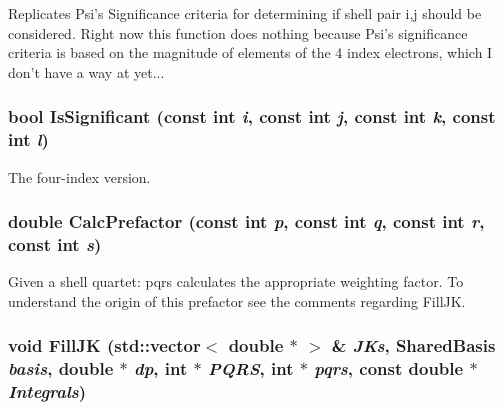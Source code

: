 Replicates Psi's Significance criteria for determining if shell pair i,j should be considered. Right now this function does nothing because Psi's significance criteria is based on the magnitude of elements of the 4 index electrons, which I don't have a way at yet... \hypertarget{classJKBuilder_1_1PsiShared_a0ec04bf57470f228eeb9e8f608014edf}{
\subsubsection[{IsSignificant}]{\setlength{\rightskip}{0pt plus 5cm}bool IsSignificant (const int {\em i}, \/  const int {\em j}, \/  const int {\em k}, \/  const int {\em l})}}
\label{classJKBuilder_1_1PsiShared_a0ec04bf57470f228eeb9e8f608014edf}


The four-\/index version. \hypertarget{classJKBuilder_1_1PsiShared_af71d3f76014ba72b33336cef6ad2e397}{
\subsubsection[{CalcPrefactor}]{\setlength{\rightskip}{0pt plus 5cm}double CalcPrefactor (const int {\em p}, \/  const int {\em q}, \/  const int {\em r}, \/  const int {\em s})}}
\label{classJKBuilder_1_1PsiShared_af71d3f76014ba72b33336cef6ad2e397}


Given a shell quartet: pqrs calculates the appropriate weighting factor. To understand the origin of this prefactor see the comments regarding FillJK. \hypertarget{classJKBuilder_1_1PsiShared_a4b5b1a33d6eb89835454c8b852a1e63b}{
\subsubsection[{FillJK}]{\setlength{\rightskip}{0pt plus 5cm}void FillJK (std::vector$<$ double $\ast$ $>$ \& {\em JKs}, \/  {\bf SharedBasis} {\em basis}, \/  double $\ast$ {\em dp}, \/  int $\ast$ {\em PQRS}, \/  int $\ast$ {\em pqrs}, \/  const double $\ast$ {\em Integrals})}}
\label{classJKBuilder_1_1PsiShared_a4b5b1a33d6eb89835454c8b852a1e63b}


